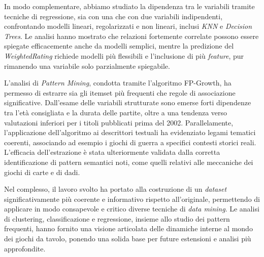 \documentclass[10pt,twocolumn]{article}
\begin{document}
In modo complementare, abbiamo studiato la dipendenza tra le variabili tramite tecniche di regressione, sia con una che con due variabili indipendenti, confrontando modelli lineari, regolarizzati e non lineari, inclusi \textit{KNN} e \textit{Decision Trees}. Le analisi hanno mostrato che relazioni fortemente correlate possono essere spiegate efficacemente anche da modelli semplici, mentre la predizione del \textit{WeightedRating} richiede modelli più flessibili e l’inclusione di più \textit{feature}, pur rimanendo una variabile solo parzialmente spiegabile.

L'analisi di \textit{Pattern Mining}, condotta tramite l'algoritmo FP-Growth, ha permesso di estrarre sia gli itemset più frequenti che regole di associazione significative. Dall'esame delle variabili strutturate sono emerse forti dipendenze tra l'età consigliata e la durata delle partite, oltre a una tendenza verso valutazioni inferiori per i titoli pubblicati prima del 2002. Parallelamente, l'applicazione dell'algoritmo ai descrittori testuali ha evidenziato legami tematici coerenti, associando ad esempio i giochi di guerra a specifici contesti storici reali. L'efficacia dell'estrazione è stata ulteriormente validata dalla corretta identificazione di pattern semantici noti, come quelli relativi alle meccaniche dei giochi di carte e di dadi.

Nel complesso, il lavoro svolto ha portato alla costruzione di un \textit{dataset} significativamente più coerente e informativo rispetto all’originale, permettendo di applicare in modo consapevole e critico diverse tecniche di \textit{data mining}. Le analisi di clustering, classificazione e regressione, insieme allo studio dei pattern frequenti, hanno fornito una visione articolata delle dinamiche interne al mondo dei giochi da tavolo, ponendo una solida base per future estensioni e analisi più approfondite.
\end{document}
